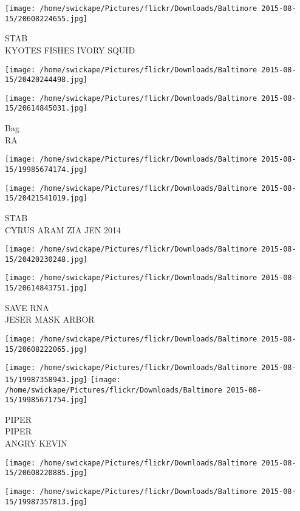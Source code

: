 \documentclass[10pt,letterpaper]{article}
\begin{document}
\vspace{0.25in}
\texttt{[image: /home/swickape/Pictures/flickr/Downloads/Baltimore 2015-08-15/20608224655.jpg]}

STAB\\
KYOTES FISHES IVORY SQUID
\pagebreak

\texttt{[image: /home/swickape/Pictures/flickr/Downloads/Baltimore 2015-08-15/20420244498.jpg]}

\vspace{0.25in}
\texttt{[image: /home/swickape/Pictures/flickr/Downloads/Baltimore 2015-08-15/20614845031.jpg]}

Bag\\
RA
\pagebreak

\texttt{[image: /home/swickape/Pictures/flickr/Downloads/Baltimore 2015-08-15/19985674174.jpg]}

\vspace{0.25in}
\texttt{[image: /home/swickape/Pictures/flickr/Downloads/Baltimore 2015-08-15/20421541019.jpg]}

STAB\\
CYRUS ARAM ZIA JEN 2014
\pagebreak

\texttt{[image: /home/swickape/Pictures/flickr/Downloads/Baltimore 2015-08-15/20420230248.jpg]}

\vspace{0.25in}
\texttt{[image: /home/swickape/Pictures/flickr/Downloads/Baltimore 2015-08-15/20614843751.jpg]}

SAVE RNA\\
JESER MASK ARBOR
\pagebreak

\texttt{[image: /home/swickape/Pictures/flickr/Downloads/Baltimore 2015-08-15/20608222065.jpg]}

\vspace{0.25in}
\texttt{[image: /home/swickape/Pictures/flickr/Downloads/Baltimore 2015-08-15/19987358943.jpg]}
\texttt{[image: /home/swickape/Pictures/flickr/Downloads/Baltimore 2015-08-15/19985671754.jpg]}

PIPER\\
PIPER\\
ANGRY KEVIN
\pagebreak

\texttt{[image: /home/swickape/Pictures/flickr/Downloads/Baltimore 2015-08-15/20608220885.jpg]}

\vspace{0.25in}
\texttt{[image: /home/swickape/Pictures/flickr/Downloads/Baltimore 2015-08-15/19987357813.jpg]}
\end{document}
